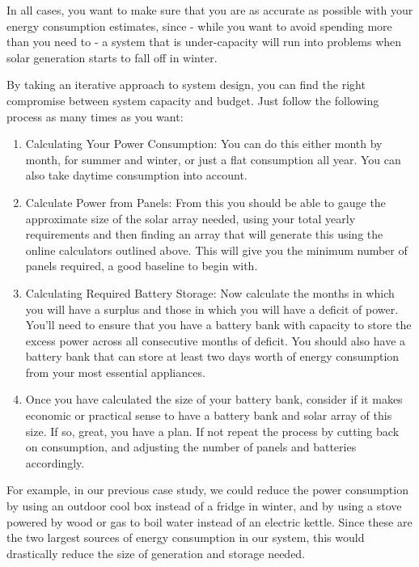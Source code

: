 \documentclass{article}
\theoremstyle{definition}
\theoremstyle{definition}
\theoremstyle{remark}
\begin{document}
    In all cases, you want to make sure that you are as accurate as possible with your energy consumption estimates, since - while you want to avoid spending more than you need to - a system that is under-capacity will run into problems when solar generation starts to fall off in winter.

    By taking an iterative approach to system design, you can find the right compromise between system capacity and budget. Just follow the following process as many times as you want:

    \begin{enumerate}
      \item Calculating Your Power Consumption: You can do this either month by month, for summer and winter, or just a flat consumption all year. You can also take daytime consumption into account.
      \item Calculate Power from Panels: From this you should be able to gauge the approximate size of the solar array needed, using your total yearly requirements and then finding an array that will generate this using the online calculators outlined above. This will give you the minimum number of panels required, a good baseline to begin with. 
      \item Calculating Required Battery Storage: Now calculate the months in which you will have a surplus and those in which you will have a deficit of power. You'll need to ensure that you have a battery bank with capacity to store the excess power across all consecutive months of deficit. You should also have a battery bank that can store at least two days worth of energy consumption from your most essential appliances.
      \item Once you have calculated the size of your battery bank, consider if it makes economic or practical sense to have a battery bank and solar array of this size. If so, great, you have a plan. If not repeat the process by cutting back on consumption, and adjusting the number of panels and batteries accordingly.
    \end{enumerate}

    For example, in our previous case study, we could reduce the power consumption by using an outdoor cool box instead of a fridge in winter, and by using a stove powered by wood or gas to boil water instead of an electric kettle. Since these are the two largest sources of energy consumption in our system, this would drastically reduce the size of generation and storage needed.
  
\end{document}

